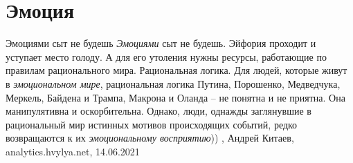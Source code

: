  
 
 
 
 
\chapter{Эмоция}

Эмоциями сыт не будешь
\emph{Эмоциями} сыт не будешь. Эйфория проходит и уступает место голоду. А для его
утоления нужны ресурсы, работающие по правилам рационального мира.
Рациональная логика. Для людей, которые живут в \emph{эмоциональном мире},
рациональная логика Путина, Порошенко, Медведчука, Меркель, Байдена и Трампа,
Макрона и Оланда – не понятна и не приятна. Она манипулятивна и оскорбительна.
Однако, люди, однажды заглянувшие в рациональный мир истинных мотивов
происходящих событий, редко возвращаются к их \emph{эмоциональному восприятию}))
, Андрей Китаев, 
analytics.hvylya.net, 14.06.2021

